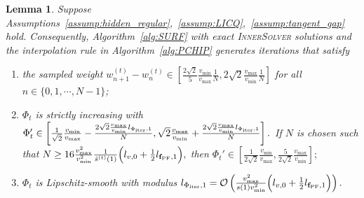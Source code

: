 \documentclass{article}
\newtheorem{lemma}{Lemma}
\newcommand{\Oc}{\mathcal{O}}
\newcommand{\fPF}{{\mathbf{f}_{\rm PF}}}
\newcommand{\Farc}{\Phi}
\begin{document}
\begin{lemma}
\label{lem:bounds_all_t_with_interp}
Suppose Assumptions~\ref{assump:hidden_regular},~\ref{assump:LICQ},~\ref{assump:tangent_gap} hold. Consequently, Algorithm~\ref{alg:SURF} with exact \textsc{InnerSolver} solutions and the interpolation rule in Algorithm~\ref{alg:PCHIP} generates iterations that satisfy
\begin{enumerate}[label=(\roman*), leftmargin=*, align=left]

 \item 
 \label{claim:grid_t}
 the sampled weight $w_{n+1}^{(t)}-w_n^{(t)}\in\left[ \frac{2\sqrt2}{5}\frac{v_{\min}}{v_{\max}}\frac{1}{N}, 2\sqrt2\frac{v_{\max}}{v_{\min}}\frac{1}{N}
 \right]$
 for all $n \in \{0,1,\cdots,N-1\}$;

 \item 
 \label{claim:secant_t}
 $\Farc_t$ is strictly increasing with
 $
 \Farc_t' \in \left[\frac{1}{\sqrt2}\frac{v_{\min}}{v_{\max}}-\frac{2\sqrt2\frac{v_{\max}}{v_{\min}}l_{\Farc_{\rm iter},1}}{N},
 \sqrt2\frac{v_{\max}}{v_{\min}}+\frac{2\sqrt2\frac{v_{\max}}{v_{\min}}l_{\Farc_{\rm iter},1}}{N}\right].
 $
 If $N$ is chosen such that
 $
 N \ge 16 \frac{v_{\max}^2}{v_{\min}^2} \frac{1}{\tilde s^{(t)}(1)}
 \Bigl(l_{v,0}+\frac12 l_{\fPF,1}\Bigr),
 $
 then
 $
 \Farc_t'\in \left[ \frac{1}{2\sqrt2}\frac{v_{\min}}{v_{\max}}, \frac{5}{2\sqrt2}\frac{v_{\max}}{v_{\min}}\right];
 $

 \item 
 \label{claim:smooth_t}
 $\Farc_t$ is Lipschitz-smooth with modulus
 $
 l_{\Farc_{\rm iter},1} = \Oc\left(\frac{v_{\max}^2}{s(1) v_{\min}^2} \Bigl(l_{v,0}+\frac12 l_{\fPF,1}\Bigr)\right).
 $
\end{enumerate}
\end{lemma}
\end{document}
